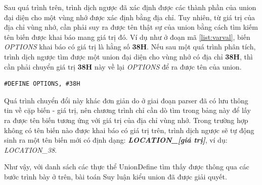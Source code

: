 Sau quá trình trên, trình dịch ngược đã xác định được các thành phần của union đại diện cho một vùng nhớ được xác định bằng địa chỉ. Tuy nhiên, từ giá trị của địa chỉ vùng nhớ, cần phải suy ra được tên thật sự của union bằng cách tìm kiếm tên biến được khai báo mang giá trị đó. Ví dụ như ở đoạn mã \ref{list:varval}, biến \textit{OPTIONS} khai báo có giá trị là hằng số \textbf{38H}. Nếu sau một quá trình phân tích, trình dịch ngược tìm được một union đại diện cho vùng nhớ có địa chỉ \textbf{38H}, thì cần phải chuyển giá trị \textbf{38H} này về lại \textit{OPTIONS} để ra được tên của union. 
\begin{lstlisting}[caption={Đoạn mã khai báo một biến có giá trị là hằng số},label={list:varval}]
#DEFINE OPTIONS, #38H
\end{lstlisting}
Quá trình chuyển đổi này khác đơn giản do ở giai đoạn parser đã có lưu thông tin về cặp biến - giá trị, nên chương trình chỉ cần dò tìm trong bảng này để lấy ra được tên biến tương ứng với giá trị của địa chỉ vùng nhớ. Trong trường hợp không có tên biến nào được khai báo có giá trị trên, trình dịch ngược sẽ tự động sinh ra một tên biến mới có định dạng: \textbf{\textit{LOCATION\_[giá trị]}}, ví dụ: \textit{LOCATION\_38}.

Như vậy, với danh sách các thực thể UnionDefine tìm thấy được thông qua các bước trình bày ở trên, bài toán Suy luận kiểu union đã được giải quyết.